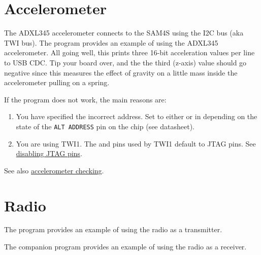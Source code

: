 \section{Accelerometer}
\label{accelerometer-test}

The ADXL345 accelerometer connects to the SAM4S using the I2C bus (aka
TWI bus).  The program
 provides
an example of using the ADXL345 accelerometer.  All going well, this
prints three 16-bit acceleration values per line to USB CDC. Tip your
board over, and the the third (z-axis) value should go negative since
this measures the effect of gravity on a little mass inside the
accelerometer pulling on a spring.

If the program does not work, the main reasons are:

\begin{enumerate}
\item
  You have specified the incorrect address.  Set
   to either  or  in
   depending on the state of the \verb|ALT ADDRESS| pin
  on the chip (see datasheet).
\item
  You are using TWI1. The  and  pins used by TWI1
  default to JTAG pins. See
  \protect\hyperref[disabling-jtag-pins]{disabling JTAG pins}.
\end{enumerate}
%
See also \protect\hyperref[checking-accelerometer]{accelerometer checking}.


\section{Radio}
\label{radio-test}

The program  provides
an example of using the radio as a transmitter.

The companion program
 provides an example
of using the radio as a receiver.

\inputminted{C}{../../src/test-apps/radio_rx_test1/radio_rx_test1.c}


